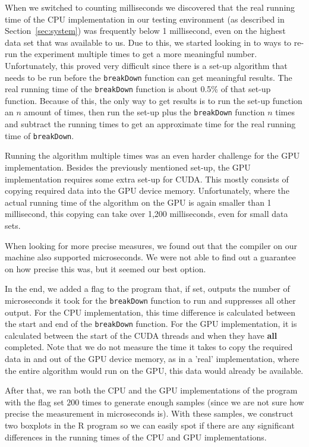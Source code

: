 When we switched to counting milliseconds we discovered that the real running time of the CPU implementation in our testing environment (as described in Section~\ref{sec:system}) was frequently below 1 millisecond, even on the highest data set that was available to us.
Due to this, we started looking in to ways to re-run the experiment multiple times to get a more meaningful number.
Unfortunately, this proved very difficult since there is a set-up algorithm that needs to be run before the \texttt{breakDown} function can get meaningful results.
The real running time of the \texttt{breakDown} function is about 0.5\% of that set-up function.
Because of this, the only way to get results is to run the set-up function an $n$ amount of times, then run the set-up plus the \texttt{breakDown} function $n$ times and subtract the running times to get an approximate time for the real running time of \texttt{breakDown}.

Running the algorithm multiple times was an even harder challenge for the GPU implementation.
Besides the previously mentioned set-up, the GPU implementation requires some extra set-up for CUDA.
This mostly consists of copying required data into the GPU device memory.
Unfortunately, where the actual running time of the algorithm on the GPU is again smaller than 1 millisecond, this copying can take over 1,200 milliseconds, even for small data sets.

When looking for more precise measures, we found out that the compiler on our machine also supported microseconds.
We were not able to find out a guarantee on how precise this was, but it seemed our best option.

In the end, we added a flag to the program that, if set, outputs the number of microseconds it took for the \texttt{breakDown} function to run and suppresses all other output.
For the CPU implementation, this time difference is calculated between the start and end of the \texttt{breakDown} function.
For the GPU implementation, it is calculated between the start of the CUDA threads and when they have \textbf{all} completed.
Note that we do not measure the time it takes to copy the required data in and out of the GPU device memory, as in a 'real' implementation, where the entire algorithm would run on the GPU, this data would already be available.

After that, we ran both the CPU and the GPU implementations of the program with the flag set $200$ times to generate enough samples (since we are not sure how precise the measurement in microseconds is).
With these samples, we construct two boxplots in the R program so we can easily spot if there are any significant differences in the running times of the CPU and GPU implementations.

